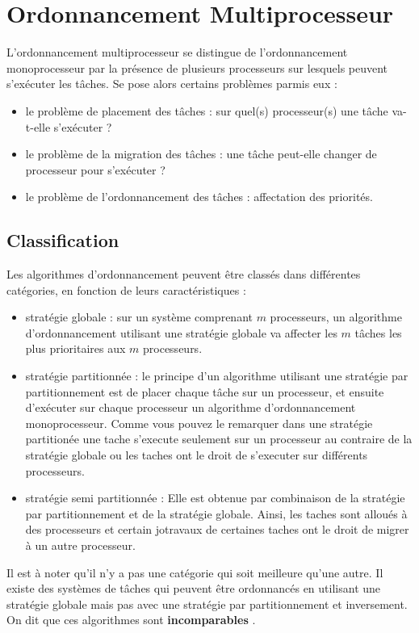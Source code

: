 \section{Ordonnancement Multiprocesseur}
L'ordonnancement multiprocesseur se distingue de l'ordonnancement
monoprocesseur par la présence de plusieurs processeurs sur lesquels
peuvent s'exécuter les tâches. Se pose alors certains problèmes parmis
eux :
\begin{itemize}
\item le problème de placement des tâches : sur quel(s) processeur(s)
  une tâche va-t-elle s'exécuter ?
\item le problème de la migration des tâches : une tâche peut-elle
  changer de processeur pour s'exécuter ?
\item le problème de l'ordonnancement des tâches : affectation des
  priorités.
\end{itemize}

\subsection{Classification}
 Les algorithmes d'ordonnancement peuvent être classés dans
 différentes catégories, en fonction de leurs caractéristiques :
\begin{itemize}
\item stratégie globale : sur un système comprenant $m$ processeurs,
  un algorithme d'ordonnancement utilisant une stratégie globale va
  affecter les $m$ tâches les plus prioritaires aux $m$ processeurs.

\item stratégie partitionnée : le principe d'un algorithme utilisant
  une stratégie par partitionnement est de placer chaque tâche sur un
  processeur, et ensuite d'exécuter sur chaque processeur un
  algorithme d'ordonnancement monoprocesseur. Comme vous pouvez le
  remarquer dans une stratégie partitionée une tache s'execute
  seulement sur un processeur au contraire de la stratégie globale ou
  les taches ont le droit de s'executer sur différents processeurs.

\item stratégie semi partitionnée : Elle est obtenue par combinaison
  de la stratégie par partitionnement et de la stratégie
  globale. Ainsi, les taches sont alloués à des processeurs et certain
  jotravaux de certaines taches ont le droit de migrer à un autre
  processeur.
\end{itemize}

Il est à noter qu'il n'y a pas une catégorie qui soit meilleure qu'une
autre. Il existe des systèmes de tâches qui peuvent être ordonnancés
en utilisant une stratégie globale mais pas avec une stratégie par
partitionnement et inversement. On dit que ces algorithmes sont
\textbf{incomparables} \cite{LW82}.


